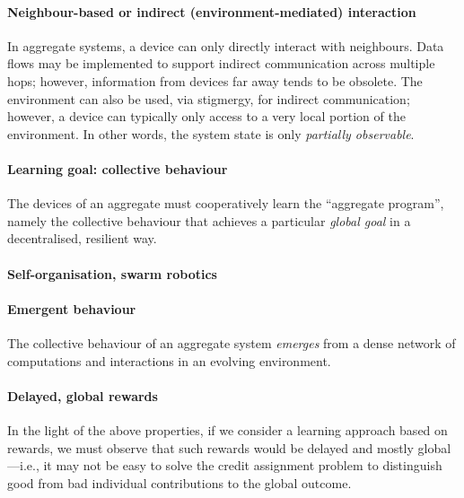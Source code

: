\documentclass[
  twocolumn,
]{ceurart}
\begin{document}

\paragraph{Neighbour-based or indirect (environment-mediated) interaction}
%
In aggregate systems, a device can only directly interact with neighbours.
%
Data flows may be implemented
 to support indirect communication across multiple hops;
 however, information from devices far away tends to be obsolete.
%
The environment can also be used, via stigmergy,
 for indirect communication;
 however, a device can typically only access 
  to a very local portion of the environment.
%
In other words, the system state is only \emph{partially observable}.
%
\paragraph{Learning goal: collective behaviour}
%
The devices of an aggregate 
 must cooperatively learn the ``aggregate program'',
 namely the collective behaviour 
 that achieves a particular \emph{global goal}
 in a decentralised, resilient way.
%

\paragraph{Self-organisation, swarm robotics}
%

\paragraph{Emergent behaviour}
%
The collective behaviour of an aggregate system
 \emph{emerges} 
 from a dense network of computations and interactions
 in an evolving environment.
%

\paragraph{Delayed, global rewards}
%
In the light of the above properties,
 if we consider a learning approach based on rewards,
 we must observe that such rewards would be
 delayed and mostly global---i.e.,
 it may not be easy to solve the credit assignment problem
 to distinguish good from bad individual contributions
 to the global outcome.
\end{document}
